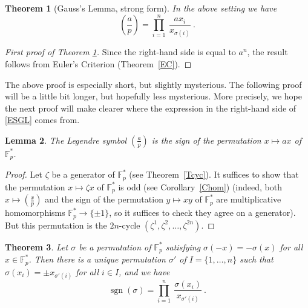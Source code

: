 \documentclass[12pt,letterpaper]{article}
\newcommand{\F}{\mathbb F}
\newcommand{\sgn}{\operatorname{sgn}}
\newtheorem{thm}{Theorem}%
\newtheorem{lem}[thm]{Lemma}
\begin{document}
\begin{thm}[Gauss's Lemma, strong form]\label{TSGL} 
In the above setting we have 
\begin{equation}\label{ESGL}
\left(\frac ap\right)=\prod_{i=1}^n\ \frac{ax_i}{x_{\sigma(i)}}\ . 
\end{equation} 
\end{thm} 

\begin{proof}[First proof of Theorem \ref{TSGL}] 
Since the right-hand side is equal to \(a^n\), the result follows from Euler's Criterion (Theorem~\ref{EC}). 
\end{proof} 

The above proof is especially short, but slightly mysterious. The following proof will be a little bit longer, but hopefully less mysterious. More precisely, we hope the next proof will make clearer where the expression in the right-hand side of \eqref{ESGL} comes from. 

\begin{lem}\label{L1} 
The Legendre symbol \((\frac ap)\) is the sign of the permutation \(x\mapsto ax\) of \(\F_p^*\). 
\end{lem} 

\begin{proof} 
Let \(\zeta\) be a generator of \(\F_p^*\) (see Theorem~\ref{Tcyc}). It suffices to show that the permutation \(x\mapsto\zeta x\) of \(\F_p^*\) is odd (see Corollary~\ref{Chom}) (indeed, both \(x\mapsto(\frac xp)\) and the sign of the permutation \(y\mapsto xy\) of \(\F_p^*\) are multiplicative homomorphisms \(\F_p^*\to\{\pm1\}\), so it suffices to check they agree on a generator). But this permutation is the \(2n\)-cycle \((\zeta^1,\zeta^2,\ldots,\zeta^{2n})\). 
\end{proof} 

\begin{thm}\label{TGGL} 
Let \(\sigma\) be a permutation of \(\F_p^*\) satisfying \(\sigma(-x)=-\sigma(x)\) for all \(x\in\F_p^*\). Then there is a unique permutation $\sigma'$ of \(I=\{1,\ldots,n\}\) such that \(\sigma(x_i)=\pm x_{\sigma'(i)}\) for all \(i\in I\), and we have 
\[
\sgn(\sigma)=\prod_{i=1}^n\ \frac{\sigma(x_i)}{x_{\sigma'(i)}}\ . 
\] 
\end{thm} 
\end{document}
